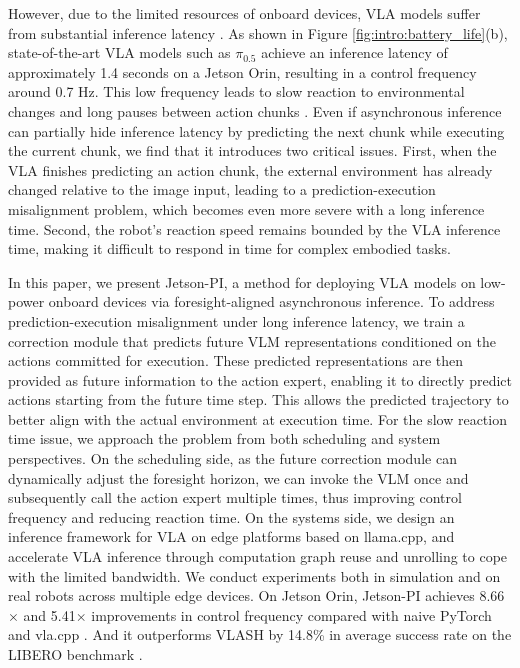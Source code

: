 However, due to the limited resources of onboard devices, VLA models suffer from substantial inference latency \cite{jiang2026fast,zhang2026a1,li2025sp}. As shown in Figure \ref{fig:intro:battery_life}(b), state-of-the-art VLA models such as $\pi_{0.5}$ \cite{intelligence2025pi_05} achieve an inference latency of approximately 1.4 seconds on a Jetson Orin, resulting in a control frequency around 0.7 Hz. This low frequency leads to slow reaction to environmental changes and long pauses between action chunks \cite{zhang2026mole,black2026real,black2025training}. Even if asynchronous inference \cite{shukor2025smolvla,zhao2025vla,wei2026f2f} can partially hide inference latency by predicting the next chunk while executing the current chunk, we find that it introduces two critical issues. First, when the VLA finishes predicting an action chunk, the external environment has already changed relative to the image input, leading to a prediction-execution misalignment problem, which becomes even more severe with a long inference time. Second, the robot's reaction speed remains bounded by the VLA inference time, making it difficult to respond in time for complex embodied tasks.

In this paper, we present Jetson-PI, a method for deploying VLA models on low-power onboard devices via foresight-aligned asynchronous inference. To address prediction-execution misalignment under long inference latency, we train a correction module that predicts future VLM representations conditioned on the actions committed for execution. These predicted representations are then provided as future information to the action expert, enabling it to directly predict actions starting from the future time step. This allows the predicted trajectory to better align with the actual environment at execution time. 
For the slow reaction time issue, we approach the problem from both scheduling and system perspectives. On the scheduling side, as the future correction module can dynamically adjust the foresight horizon, we can invoke the VLM once and subsequently call the action expert multiple times, thus improving control frequency and reducing reaction time. On the systems side, we design an inference framework for VLA on edge platforms based on llama.cpp, and accelerate VLA inference through computation graph reuse and unrolling to cope with the limited bandwidth.
We conduct experiments both in simulation and on real robots across multiple edge devices. On Jetson Orin, Jetson-PI achieves 8.66$\times$ and 5.41$\times$ improvements in control frequency compared with naive PyTorch and vla.cpp \cite{nguyen2026vla}. And it outperforms VLASH \cite{tang2025vlash} by 14.8\% in average success rate on the LIBERO benchmark \cite{liu2023libero}.

